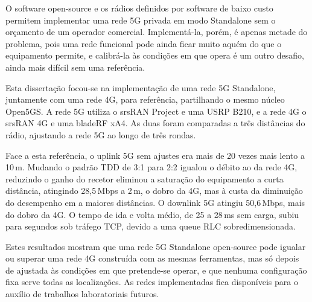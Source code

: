 
%

O software open-source e os rádios definidos por software de baixo custo permitem implementar uma rede 5G privada em modo Standalone sem o orçamento de um operador comercial. Implementá-la, porém, é apenas metade do problema, pois uma rede funcional pode ainda ficar muito aquém do que o equipamento permite, e calibrá-la às condições em que opera é um outro desafio, ainda mais difícil sem uma referência.

Esta dissertação focou-se na implementação de uma rede 5G Standalone, juntamente com uma rede 4G, para referência, partilhando o mesmo núcleo Open5GS. A rede 5G utiliza o srsRAN Project e uma USRP B210, e a rede 4G o srsRAN 4G e uma bladeRF xA4. As duas foram comparadas a três distâncias do rádio, ajustando a rede 5G ao longo de três rondas.

Face a esta referência, o uplink 5G sem ajustes era mais de 20 vezes mais lento a 10\,m. Mudando o padrão TDD de 3:1 para 2:2 igualou o débito ao da rede 4G, reduzindo o ganho do recetor eliminou a saturação do equipamento a curta distância, atingindo 28,5\,Mbps a 2\,m, o dobro da 4G, mas à custa da diminuição do desempenho em a maiores distâncias. O downlink 5G atingiu 50,6\,Mbps, mais do dobro da 4G. O tempo de ida e volta médio, de 25 a 28\,ms sem carga, subiu para segundos sob tráfego TCP, devido a uma queue RLC sobredimensionada.

Estes resultados mostram que uma rede 5G Standalone open-source pode igualar ou superar uma rede 4G construída com as mesmas ferramentas, mas só depois de ajustada às condições em que pretende-se operar, e que nenhuma configuração fixa serve todas as localizações. As redes implementadas fica disponíveis para o auxílio de trabalhos laboratoriais futuros.

